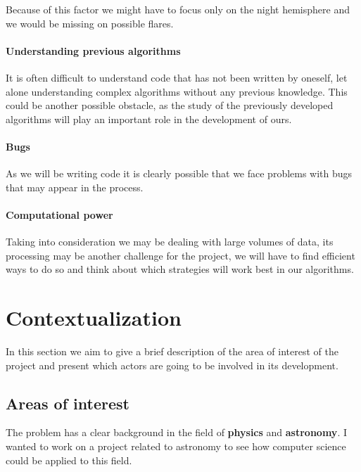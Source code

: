 Because of this factor we might have to focus only on the night hemisphere and we would be missing on possible flares.

\paragraph{Understanding previous algorithms}

It is often difficult to understand code that has not been written by oneself, let alone understanding complex algorithms without any previous knowledge. This could be another possible obstacle, as the study of the previously developed algorithms will play an important role in the development of ours.

\paragraph{Bugs}

As we will be writing code it is clearly possible that we face problems with bugs that may appear in the process.

\paragraph{Computational power}

Taking into consideration we may be dealing with large volumes of data, its processing may be another challenge for the project, we will have to find efficient ways to do so and think about which strategies will work best in our algorithms.

\newpage
\section{Contextualization}

In this section we aim to give a brief description of the area of interest of the project and present which actors are going to be involved in its development.

\subsection{Areas of interest}

The problem has a clear background in the field of \textbf{physics} and \textbf{astronomy}. I wanted to work on a project related to astronomy to see how computer science could be applied to this field. 

